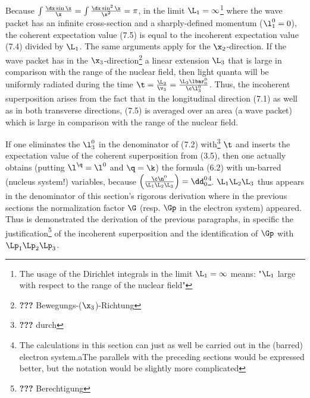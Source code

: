 \documentclass{article}
\newcommand{\WTF}[1]{\footnote{\textbf{???} #1}}
\begin{document}
Because $\int\frac{\dx\sin\x}{\x}=\int\frac{\dx\sin^2\x}{\x^2} = \pi$, in the limit $\L_1 = \infty$\footnote{The usage of the Dirichlet integrals in the limit $\L_1=\infty$ means: "$\L_1$ large with respect to the range of the nuclear field"} where the wave packet has an infinite cross-section and a sharply-defined momentum ($\l^0_1=0$), the coherent expectation value (7.5) is equal to the incoherent expectation value (7.4) divided by $\L_1$. The same arguments apply for the $\x_2$-direction. If the wave packet has in the $\x_3$-direction\WTF{Bewegungs-($\x_3$)-Richtung} a linear extension $\L_3$ that is large in comparison with the range of the nuclear field, then light quanta will be uniformly radiated during the time $\t=\frac{\L_3}{\v_3}=\frac{\L_3\lbar^0_0}{\c\l^0_3}$. Thus, the incoherent superposition arises from the fact that in the longitudinal direction (7.1) as  well as in both transverse directions, (7.5) is averaged over an area (a wave packet) which is large in comparison with the range of the nuclear field.

If one eliminates the $\l^0_3$ in the denominator of (7.2) with\WTF{durch} $\t$ and inserts the expectation value of the coherent superposition from (3.5), then one actually obtains (putting $\l^\q=\l^0$ and $\q=\k$) the formula (6.2) with un-barred (nucleus system!) variables, because $\left(\frac{\c\n^0}{\L_1\L_2\L_3}\right) = \dd^0_0$\footnote{The calculations in this section can just as well be carried out in the (barred) electron system.aThe parallels with the preceding sections would be expressed better, but the notation would be slightly more complicated}. $\L_1\L_2\L_3$ thus appears in the denominator of this section's rigorous derivation where in the previous sections the normalization factor $\G$ (resp. $\Gp$ in the electron system) appeared. Thus is demonstrated the derivation of the previous paragraphs, in specific the justification\WTF{Berechtigung} of the incoherent superposition and the identification of $\Gp$ with $\Lp_1\Lp_2\Lp_3$.
\end{document}
